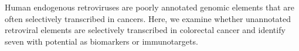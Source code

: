 Human endogenous retroviruses are poorly annotated genomic elements that are often selectively transcribed in cancers.
Here, we examine whether unannotated retroviral elements are selectively transcribed in colorectal cancer and identify seven with potential as biomarkers or immunotargets.
